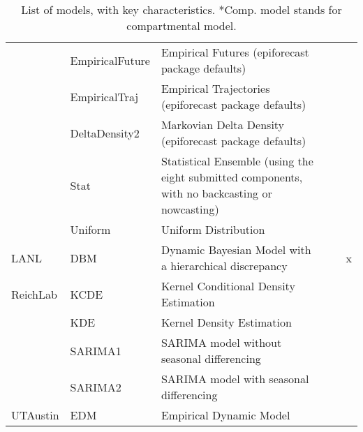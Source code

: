 \begin{table}
\begin{tabular}{p{1.69cm} l p{7.5cm}  p{1.70cm}  p{1.7cm}}
~        & EmpiricalFuture    & Empirical Futures (epiforecast package defaults)                                               & ~             & ~                   \\ 
~        & EmpiricalTraj      & Empirical Trajectories (epiforecast package defaults)                                          & ~             & ~                   \\ 
~        & DeltaDensity2      & Markovian Delta Density (epiforecast package defaults)                                         & ~             & ~                   \\ 
~        & Stat               & Statistical Ensemble (using the eight submitted components, with no backcasting or nowcasting) & ~             & ~                   \\
~        & Uniform            & Uniform Distribution                                                                           & ~             & ~                   \\ 
\hline
LANL     & DBM                & Dynamic Bayesian Model with a hierarchical discrepancy                                         & ~             & x                   \\ 
\hline
ReichLab & KCDE               & Kernel Conditional Density Estimation                                                          & ~             & ~                   \\ 
~        & KDE                & Kernel Density Estimation                                                                      & ~             & ~                   \\ 
~        & SARIMA1            & SARIMA model without seasonal differencing                                                     & ~             & ~                   \\ 
~        & SARIMA2            & SARIMA model with seasonal differencing                                                        & ~             & ~                   \\ 
\hline
UTAustin & EDM                & Empirical Dynamic Model                                                                        & ~             & ~                   \\ 
\end{tabular}
\caption{List of models, with key characteristics. *Comp. model stands for compartmental model.}
\label{tab:model-list}
\end{table}